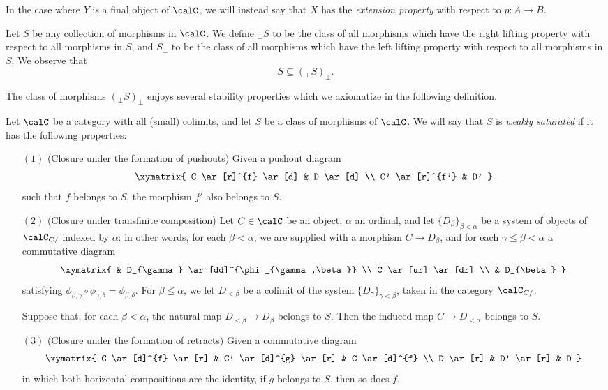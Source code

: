 \begin{remark}
In the case where $Y$ is a final object of $\calC$, we will instead say that
$X$ has the {\it extension property} with respect to $p: A \rightarrow B$.
\end{remark}

Let $S$ be any collection of morphisms in $\calC$. We define
$_{\perp} S$ to be the class of all morphisms which have the right
lifting property with respect to all morphisms in $S$, and $S_{\perp}$
to be the class of all morphisms which have the left lifting
property with respect to all morphisms in $S$. We observe that
$$S \subseteq (_{\perp}S)_{\perp}.$$

The class of morphisms $(_{\perp} S)_{\perp}$ enjoys several
stability properties which we axiomatize in the following definition.

\begin{definition}\label{saturated}
Let $\calC$ be a category with all (small) colimits, and let $S$ be a class of morphisms of $\calC$. We will say that $S$ is {\it weakly saturated} if it has the following properties:

\begin{itemize}
\item[$(1)$] (Closure under the formation of pushouts) Given a pushout diagram
$$ \xymatrix{ C \ar[r]^{f} \ar[d] & D \ar[d] \\
C' \ar[r]^{f'} & D' }$$
such that $f$ belongs to $S$, the morphism $f'$ also belongs to $S$. 

\item[$(2)$] (Closure under transfinite composition) Let $C \in \calC$ be an object, $\alpha$
an ordinal, and let $\{ D_{\beta} \}_{\beta < \alpha} $ be a system of objects of $\calC_{C/}$
indexed by $\alpha$: in other words, for each $\beta < \alpha$, we are supplied with a morphism $C \rightarrow D_{\beta}$, and for each $\gamma \leq \beta < \alpha$ a commutative diagram
$$ \xymatrix{ & D_{\gamma} \ar[dd]^{\phi_{\gamma,\beta}} \\
C \ar[ur] \ar[dr] \\
& D_{\beta} }$$
satisfying $\phi_{\beta,\gamma} \circ \phi_{\gamma, \delta} = \phi_{\beta, \delta}.$
For $\beta \leq \alpha$, we let $D_{<\beta}$ be a colimit of the system
$\{ D_{\gamma} \}_{\gamma < \beta}$, taken in the category $\calC_{C/}$. 

Suppose that, for each $\beta < \alpha$, the natural map $D_{< \beta} \rightarrow D_{\beta}$
belongs to $S$. Then the induced map $C \rightarrow D_{<\alpha}$ belongs to $S$.

\item[$(3)$] (Closure under the formation of retracts) Given a commutative diagram
$$ \xymatrix{ C \ar[d]^{f} \ar[r] & C' \ar[d]^{g} \ar[r] & C \ar[d]^{f} \\
D \ar[r] & D' \ar[r] & D }$$
in which both horizontal compositions are the identity, if $g$ belongs to $S$, then so does $f$.
\end{itemize}
\end{definition}


